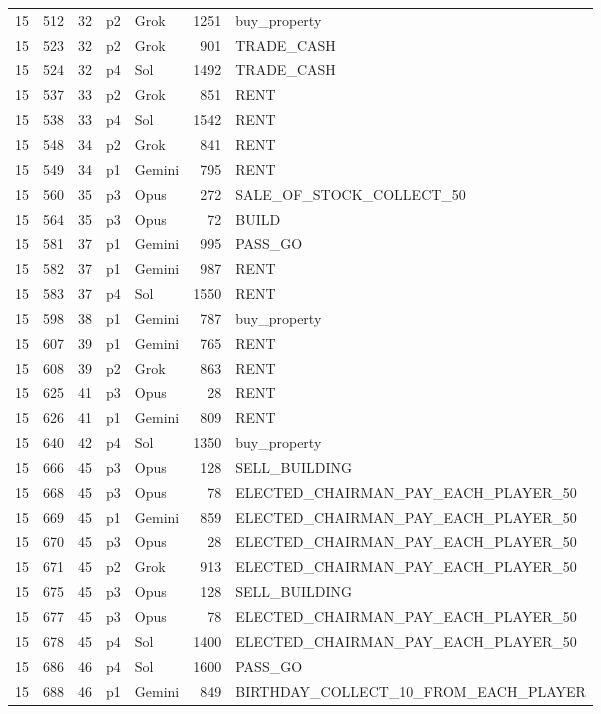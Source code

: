 \begin{longtable}{r r r l l r L{2.2in}}
15 & 512 & 32 & p2 & Grok & 1251 & buy\_property \\
15 & 523 & 32 & p2 & Grok & 901 & TRADE\_CASH \\
15 & 524 & 32 & p4 & Sol & 1492 & TRADE\_CASH \\
15 & 537 & 33 & p2 & Grok & 851 & RENT \\
15 & 538 & 33 & p4 & Sol & 1542 & RENT \\
15 & 548 & 34 & p2 & Grok & 841 & RENT \\
15 & 549 & 34 & p1 & Gemini & 795 & RENT \\
15 & 560 & 35 & p3 & Opus & 272 & SALE\_OF\_STOCK\_COLLECT\_50 \\
15 & 564 & 35 & p3 & Opus & 72 & BUILD \\
15 & 581 & 37 & p1 & Gemini & 995 & PASS\_GO \\
15 & 582 & 37 & p1 & Gemini & 987 & RENT \\
15 & 583 & 37 & p4 & Sol & 1550 & RENT \\
15 & 598 & 38 & p1 & Gemini & 787 & buy\_property \\
15 & 607 & 39 & p1 & Gemini & 765 & RENT \\
15 & 608 & 39 & p2 & Grok & 863 & RENT \\
15 & 625 & 41 & p3 & Opus & 28 & RENT \\
15 & 626 & 41 & p1 & Gemini & 809 & RENT \\
15 & 640 & 42 & p4 & Sol & 1350 & buy\_property \\
15 & 666 & 45 & p3 & Opus & 128 & SELL\_BUILDING \\
15 & 668 & 45 & p3 & Opus & 78 & ELECTED\_CHAIRMAN\_PAY\_EACH\_PLAYER\_50 \\
15 & 669 & 45 & p1 & Gemini & 859 & ELECTED\_CHAIRMAN\_PAY\_EACH\_PLAYER\_50 \\
15 & 670 & 45 & p3 & Opus & 28 & ELECTED\_CHAIRMAN\_PAY\_EACH\_PLAYER\_50 \\
15 & 671 & 45 & p2 & Grok & 913 & ELECTED\_CHAIRMAN\_PAY\_EACH\_PLAYER\_50 \\
15 & 675 & 45 & p3 & Opus & 128 & SELL\_BUILDING \\
15 & 677 & 45 & p3 & Opus & 78 & ELECTED\_CHAIRMAN\_PAY\_EACH\_PLAYER\_50 \\
15 & 678 & 45 & p4 & Sol & 1400 & ELECTED\_CHAIRMAN\_PAY\_EACH\_PLAYER\_50 \\
15 & 686 & 46 & p4 & Sol & 1600 & PASS\_GO \\
15 & 688 & 46 & p1 & Gemini & 849 & BIRTHDAY\_COLLECT\_10\_FROM\_EACH\_PLAYER \\

\end{longtable}
